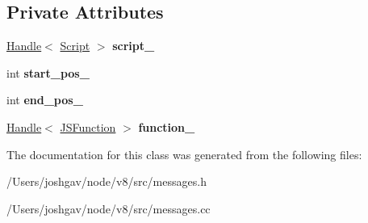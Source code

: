 \subsection*{Private Attributes}
\begin{DoxyCompactItemize}
\item 
\hyperlink{classv8_1_1internal_1_1_handle}{Handle}$<$ \hyperlink{classv8_1_1internal_1_1_script}{Script} $>$ {\bfseries script\+\_\+}\hypertarget{classv8_1_1internal_1_1_message_location_a1905898c5cf163276a06100a1e62d308}{}\label{classv8_1_1internal_1_1_message_location_a1905898c5cf163276a06100a1e62d308}

\item 
int {\bfseries start\+\_\+pos\+\_\+}\hypertarget{classv8_1_1internal_1_1_message_location_ac07461b80475a01b06c04276836bffd2}{}\label{classv8_1_1internal_1_1_message_location_ac07461b80475a01b06c04276836bffd2}

\item 
int {\bfseries end\+\_\+pos\+\_\+}\hypertarget{classv8_1_1internal_1_1_message_location_a9099c0df677558cf66b3649b2c398b3f}{}\label{classv8_1_1internal_1_1_message_location_a9099c0df677558cf66b3649b2c398b3f}

\item 
\hyperlink{classv8_1_1internal_1_1_handle}{Handle}$<$ \hyperlink{classv8_1_1internal_1_1_j_s_function}{J\+S\+Function} $>$ {\bfseries function\+\_\+}\hypertarget{classv8_1_1internal_1_1_message_location_a642ffd62508645cdaf137eef46abbfcb}{}\label{classv8_1_1internal_1_1_message_location_a642ffd62508645cdaf137eef46abbfcb}

\end{DoxyCompactItemize}


The documentation for this class was generated from the following files\+:\begin{DoxyCompactItemize}
\item 
/\+Users/joshgav/node/v8/src/messages.\+h\item 
/\+Users/joshgav/node/v8/src/messages.\+cc\end{DoxyCompactItemize}
